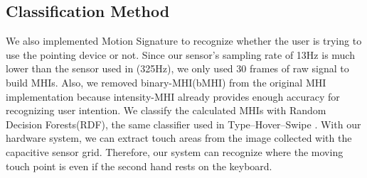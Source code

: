 \subsection{Classification Method}
We also implemented Motion Signature \cite{96bytes} to recognize whether the user is trying to use the pointing device or not.
Since our sensor's sampling rate of 13Hz is much lower than the sensor used in \cite{96bytes}(325Hz), we only used 30 frames of raw signal to build MHIs. 
Also, we removed binary-MHI(bMHI) from the original MHI implementation because intensity-MHI already provides enough accuracy for recognizing user intention.
We classify the calculated MHIs with Random Decision Forests(RDF), the same classifier used in Type–Hover–Swipe \cite{96bytes}.
With our hardware system, we can extract touch areas from the image collected with the capacitive sensor grid. Therefore, our system can recognize where the moving touch point is even if the second hand rests on the keyboard. 

\vfill
\columnbreak



